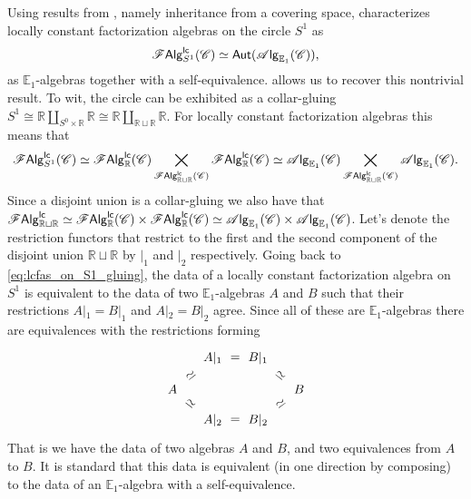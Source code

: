 \documentclass[../text]{subfiles}
\begin{document}
\begin{example}\label{ex:reproduce_lcfas_on_S1}
    Using results from \cite[prop.4.0.1]{cg2016}, namely inheritance from a covering space, \cite[sec.5.5]{ginot2015} characterizes locally constant factorization algebras on the circle $S^1$ as
    \begin{equation}
        \mathscr{F} \mathsf{Alg}^{\mathsf{lc}}_{S^1} (\mathscr{C}) \simeq \mathsf{Aut} (\mathscr{A} \mathsf{lg}_{\mathbb{E}_1} (\mathscr{C})),
    \end{equation}
    as $\mathbb{E}_1$-algebras together with a self-equivalence.  allows us to recover this nontrivial result. To wit, the circle can be exhibited as a collar-gluing $S^1 \cong \mathbb{R} \coprod_{S^0 \times \mathbb{R}} \mathbb{R} \cong \mathbb{R} \coprod_{\mathbb{R} \sqcup \mathbb{R}} \mathbb{R}$. For locally constant factorization algebras this means that
    \begin{equation}\label{eq:lcfas_on_S1_gluing}
        \mathscr{F} \mathsf{Alg}^{\mathsf{lc}}_{S^1} (\mathscr{C}) \simeq \mathscr{F} \mathsf{Alg}^{\mathsf{lc}}_{\mathbb{R}} (\mathscr{C}) \bigtimes_{\mathscr{F} \mathsf{Alg}^{\mathsf{lc}}_{\mathbb{R} \sqcup \mathbb{R}} (\mathscr{C})} \mathscr{F} \mathsf{Alg}^{\mathsf{lc}}_{\mathbb{R}} (\mathscr{C}) \simeq \mathscr{A} \mathsf{lg}_{\mathbb{E}_1} (\mathscr{C}) \bigtimes_{\mathscr{F} \mathsf{Alg}^{\mathsf{lc}}_{\mathbb{R} \sqcup \mathbb{R}} (\mathscr{C})} \mathscr{A} \mathsf{lg}_{\mathbb{E}_1} (\mathscr{C}).
    \end{equation}
    Since a disjoint union is a collar-gluing we also have that $\mathscr{F} \mathsf{Alg}^{\mathsf{lc}}_{\mathbb{R} \sqcup \mathbb{R}} \simeq \mathscr{F} \mathsf{Alg}^{\mathsf{lc}}_{\mathbb{R}} (\mathscr{C}) \times \mathscr{F} \mathsf{Alg}^{\mathsf{lc}}_{\mathbb{R}} (\mathscr{C}) \simeq \mathscr{A} \mathsf{lg}_{\mathbb{E}_1} (\mathscr{C}) \times \mathscr{A} \mathsf{lg}_{\mathbb{E}_1} (\mathscr{C})$. Let's denote the restriction functors that restrict to the first and the second component of the disjoint union $\mathbb{R} \sqcup \mathbb{R}$ by $|_1$ and $|_2$ respectively. Going back to \cref{eq:lcfas_on_S1_gluing}, the data of a locally constant factorization algebra on $S^1$ is equivalent to the data of two $\mathbb{E}_1$-algebras $A$ and $B$ such that their restrictions $A|_1 = B|_1$ and $A|_2 = B|_2$ agree. Since all of these are $\mathbb{E}_1$-algebras there are equivalences with the restrictions forming
    \begin{equation}
        \begin{tikzcd}[row sep = small, column sep= small]
            & A|_1 \arrow[r, phantom, "=", description] & B|_1 & \\
            A \arrow[rd, phantom, "\simeq", sloped, description] \arrow[ru, phantom, "\simeq", sloped, description] & & & B \arrow[lu, phantom, "\simeq", sloped, description] \arrow[ld,  phantom, "\simeq", sloped, description] \\
            & A|_2 \arrow[r, phantom, "=", description] & B|_2 &                        
        \end{tikzcd}
    \end{equation}
    That is we have the data of two algebras $A$ and $B$, and two equivalences from $A$ to $B$. It is standard that this data is equivalent (in one direction by composing) to the data of an $\mathbb{E}_1$-algebra with a self-equivalence.
\end{example}
\end{document}
